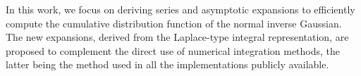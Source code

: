 \documentclass[10pt,a4paper,oneside]{article}
\numberwithin{equation}{section}
\begin{document}
%
%

In this work, we focus on deriving series and asymptotic expansions to efficiently compute the cumulative distribution function of the normal inverse Gaussian. The new expansions, derived from the Laplace-type integral representation, are proposed to complement the direct use of numerical integration methods, the latter being the method used in all the implementations publicly available. 
\end{document}
